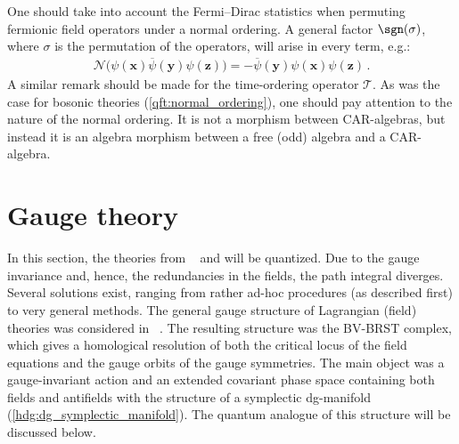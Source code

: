 
    \begin{remark}\label{qft:ordering_morphism}
        One should take into account the Fermi--Dirac statistics when permuting fermionic field operators under a normal ordering. A general factor $\sgn(\sigma)$, where $\sigma$ is the permutation of the operators, will arise in every term, e.g.:
        \begin{gather}
            \mathcal{N}\bigl(\psi(\symbf{x})\overline\psi(\symbf{y})\psi(\symbf{z})\bigr) = -\overline\psi(\symbf{y})\psi(\symbf{x})\psi(\symbf{z})\,.
        \end{gather}
        A similar remark should be made for the time-ordering operator $\mathcal{T}$. As was the case for bosonic theories (\cref{qft:normal_ordering}), one should pay attention to the nature of the normal ordering. It is not a morphism between CAR-algebras, but instead it is an algebra morphism between a free (odd) algebra and a CAR-algebra.
    \end{remark}

\section{Gauge theory}\label{section:qft_gauge_theory}

    In this section, the theories from ~ and  will be quantized. Due to the gauge invariance and, hence, the redundancies in the fields, the path integral diverges. Several solutions exist, ranging from rather ad-hoc procedures (as described first) to very general methods. The general gauge structure of Lagrangian (field) theories was considered in ~. The resulting structure was the BV-BRST complex, which gives a homological resolution of both the critical locus of the field equations and the gauge orbits of the gauge symmetries. The main object was a gauge-invariant action and an extended covariant phase space containing both fields and antifields with the structure of a symplectic dg-manifold (\cref{hdg:dg_symplectic_manifold}). The quantum analogue of this structure will be discussed below.

